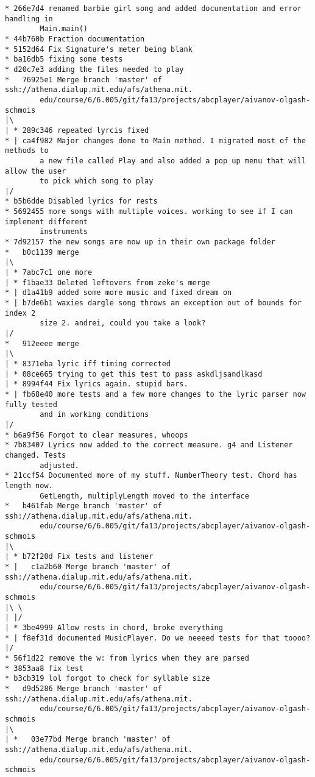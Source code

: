 \documentclass[12pt]{book}
\begin{document}
\begin{Verbatim}
* 266e7d4 renamed barbie girl song and added documentation and error handling in 
        Main.main()
* 44b760b Fraction documentation
* 5152d64 Fix Signature's meter being blank
* ba16db5 fixing some tests
* d20c7e3 adding the files needed to play
*   76925e1 Merge branch 'master' of ssh://athena.dialup.mit.edu/afs/athena.mit.
        edu/course/6/6.005/git/fa13/projects/abcplayer/aivanov-olgash-schmois
|\
| * 289c346 repeated lyrcis fixed
* | ca4f982 Major changes done to Main method. I migrated most of the methods to 
        a new file called Play and also added a pop up menu that will allow the user 
        to pick which song to play
|/
* b5b6dde Disabled lyrics for rests
* 5692455 more songs with multiple voices. working to see if I can implement different 
        instruments
* 7d92157 the new songs are now up in their own package folder
*   b0c1139 merge
|\
| * 7abc7c1 one more
| * f1bae33 Deleted leftovers from zeke's merge
* | d1a41b9 added some more music and fixed dream on
* | b7de6b1 waxies dargle song throws an exception out of bounds for index 2 
        size 2. andrei, could you take a look?
|/
*   912eeee merge
|\
| * 8371eba lyric iff timing corrected
| * 08ce665 trying to get this test to pass askdljsandlkasd
| * 8994f44 Fix lyrics again. stupid bars.
* | fb68e40 more tests and a few more changes to the lyric parser now fully tested 
        and in working conditions
|/
* b6a9f56 Forgot to clear measures, whoops
* 7b83407 Lyrics now added to the correct measure. g4 and Listener changed. Tests 
        adjusted.
* 21ccf54 Documented more of my stuff. NumberTheory test. Chord has length now. 
        GetLength, multiplyLength moved to the interface
*   b461fab Merge branch 'master' of ssh://athena.dialup.mit.edu/afs/athena.mit.
        edu/course/6/6.005/git/fa13/projects/abcplayer/aivanov-olgash-schmois
|\
| * b72f20d Fix tests and listener
* |   c1a2b60 Merge branch 'master' of ssh://athena.dialup.mit.edu/afs/athena.mit.
        edu/course/6/6.005/git/fa13/projects/abcplayer/aivanov-olgash-schmois
|\ \
| |/
| * 3be4999 Allow rests in chord, broke everything
* | f8ef31d documented MusicPlayer. Do we neeeed tests for that toooo?
|/
* 56f1d22 remove the w: from lyrics when they are parsed
* 3853aa8 fix test
* b3cb319 lol forgot to check for syllable size
*   d9d5286 Merge branch 'master' of ssh://athena.dialup.mit.edu/afs/athena.mit.
        edu/course/6/6.005/git/fa13/projects/abcplayer/aivanov-olgash-schmois
|\
| *   03e77bd Merge branch 'master' of ssh://athena.dialup.mit.edu/afs/athena.mit.
        edu/course/6/6.005/git/fa13/projects/abcplayer/aivanov-olgash-schmois

\end{Verbatim}
\end{document}
